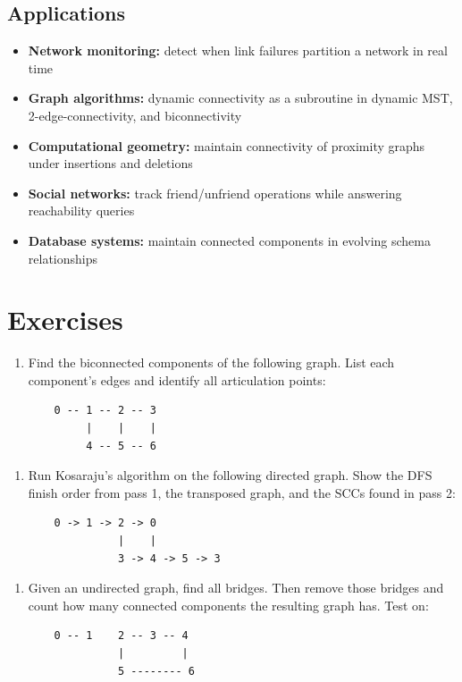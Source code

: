 \subsection{Applications}

\begin{itemize}
\item \textbf{Network monitoring:} detect when link failures partition a network in real time
\item \textbf{Graph algorithms:} dynamic connectivity as a subroutine in dynamic MST, 2-edge-connectivity, and biconnectivity
\item \textbf{Computational geometry:} maintain connectivity of proximity graphs under insertions and deletions
\item \textbf{Social networks:} track friend/unfriend operations while answering reachability queries
\item \textbf{Database systems:} maintain connected components in evolving schema relationships
\end{itemize}

\section{Exercises}

\begin{enumerate}
\item Find the biconnected components of the following graph. List each component's edges and identify all articulation points:
\begin{lstlisting}
    0 -- 1 -- 2 -- 3
         |    |    |
         4 -- 5 -- 6
\end{lstlisting}
\end{enumerate}

\begin{enumerate}
\item Run Kosaraju's algorithm on the following directed graph. Show the DFS finish order from pass 1, the transposed graph, and the SCCs found in pass 2:
\begin{lstlisting}
    0 -> 1 -> 2 -> 0
              |    |
              3 -> 4 -> 5 -> 3
\end{lstlisting}
\end{enumerate}

\begin{enumerate}
\item Given an undirected graph, find all bridges. Then remove those bridges and count how many connected components the resulting graph has. Test on:
\begin{lstlisting}
    0 -- 1    2 -- 3 -- 4
              |         |
              5 -------- 6
\end{lstlisting}
\end{enumerate}

